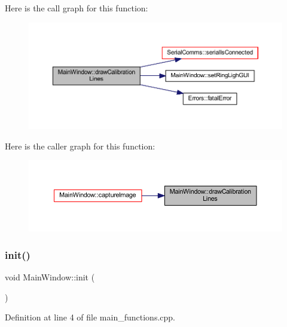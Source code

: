 Here is the call graph for this function\+:
\nopagebreak
\begin{figure}[H]
\begin{center}
\leavevmode
\includegraphics[width=350pt]{classMainWindow_a46d10bf790a404b85083416112d51c08_cgraph}
\end{center}
\end{figure}
Here is the caller graph for this function\+:
\nopagebreak
\begin{figure}[H]
\begin{center}
\leavevmode
\includegraphics[width=350pt]{classMainWindow_a46d10bf790a404b85083416112d51c08_icgraph}
\end{center}
\end{figure}
\mbox{\label{classMainWindow_a671e7e5b0a3a7a3fb1cf44c5c8377952}} 
\subsubsection{\texorpdfstring{init()}{init()}}
{\footnotesize\ttfamily void Main\+Window\+::init (\begin{DoxyParamCaption}{ }\end{DoxyParamCaption})}



Definition at line 4 of file main\+\_\+functions.\+cpp.

